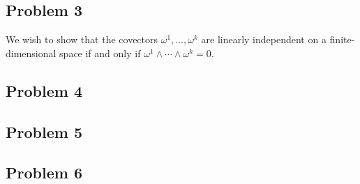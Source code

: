 \documentclass{../../mathnotes}
\begin{document}
\subsection*{Problem 3}

We wish to show that the covectors $\omega^1,\ldots,\omega^k$ are linearly independent on a finite-dimensional space
if and only if $\omega^1\wedge\cdots\wedge\omega^k=0$.

\subsection*{Problem 4}
\subsection*{Problem 5}
\subsection*{Problem 6}
\end{document}
